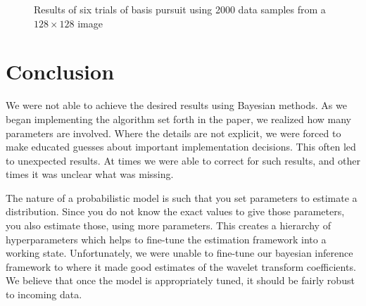 \documentclass{IEEEtran}
\begin{document}
\begin{figure}[ht]
{  }%
  \qquad
  \caption{Results of six trials of basis pursuit using 2000 data samples from a $128\times128$ image}
  \label{fig:bp-results}
\end{figure}

\section{Conclusion}
We were not able to achieve the desired results using Bayesian methods.  As we began implementing the algorithm set forth in the paper, we realized how many parameters are involved.  Where the details are not explicit, we were forced to make educated guesses about important implementation decisions. This often led to unexpected results.  At times we were able to correct for such results, and other times it was unclear what was missing.

The nature of a probabilistic model is such that you set parameters to estimate a distribution. Since you do not know the exact values to give those parameters, you also estimate those, using more parameters.  This creates a hierarchy of hyperparameters which helps to fine-tune the estimation framework into a working state.  Unfortunately, we were unable to fine-tune our bayesian inference framework to where it made good estimates of the wavelet transform coefficients. We believe that once the model is appropriately tuned, it should be fairly robust to incoming data.



\end{document}
